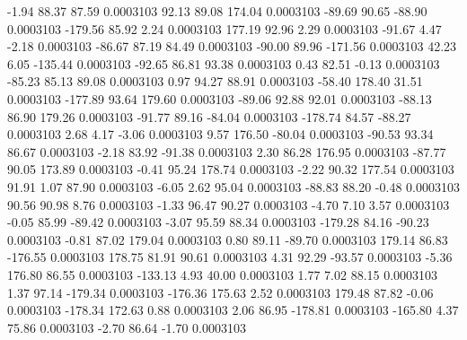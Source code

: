        -1.94       88.37       87.59     0.0003103
       92.13       89.08      174.04     0.0003103
      -89.69       90.65      -88.90     0.0003103
     -179.56       85.92        2.24     0.0003103
      177.19       92.96        2.29     0.0003103
      -91.67        4.47       -2.18     0.0003103
      -86.67       87.19       84.49     0.0003103
      -90.00       89.96     -171.56     0.0003103
       42.23        6.05     -135.44     0.0003103
      -92.65       86.81       93.38     0.0003103
        0.43       82.51       -0.13     0.0003103
      -85.23       85.13       89.08     0.0003103
        0.97       94.27       88.91     0.0003103
      -58.40      178.40       31.51     0.0003103
     -177.89       93.64      179.60     0.0003103
      -89.06       92.88       92.01     0.0003103
      -88.13       86.90      179.26     0.0003103
      -91.77       89.16      -84.04     0.0003103
     -178.74       84.57      -88.27     0.0003103
        2.68        4.17       -3.06     0.0003103
        9.57      176.50      -80.04     0.0003103
      -90.53       93.34       86.67     0.0003103
       -2.18       83.92      -91.38     0.0003103
        2.30       86.28      176.95     0.0003103
      -87.77       90.05      173.89     0.0003103
       -0.41       95.24      178.74     0.0003103
       -2.22       90.32      177.54     0.0003103
       91.91        1.07       87.90     0.0003103
       -6.05        2.62       95.04     0.0003103
      -88.83       88.20       -0.48     0.0003103
       90.56       90.98        8.76     0.0003103
       -1.33       96.47       90.27     0.0003103
       -4.70        7.10        3.57     0.0003103
       -0.05       85.99      -89.42     0.0003103
       -3.07       95.59       88.34     0.0003103
     -179.28       84.16      -90.23     0.0003103
       -0.81       87.02      179.04     0.0003103
        0.80       89.11      -89.70     0.0003103
      179.14       86.83     -176.55     0.0003103
      178.75       81.91       90.61     0.0003103
        4.31       92.29      -93.57     0.0003103
       -5.36      176.80       86.55     0.0003103
     -133.13        4.93       40.00     0.0003103
        1.77        7.02       88.15     0.0003103
        1.37       97.14     -179.34     0.0003103
     -176.36      175.63        2.52     0.0003103
      179.48       87.82       -0.06     0.0003103
     -178.34      172.63        0.88     0.0003103
        2.06       86.95     -178.81     0.0003103
     -165.80        4.37       75.86     0.0003103
       -2.70       86.64       -1.70     0.0003103
